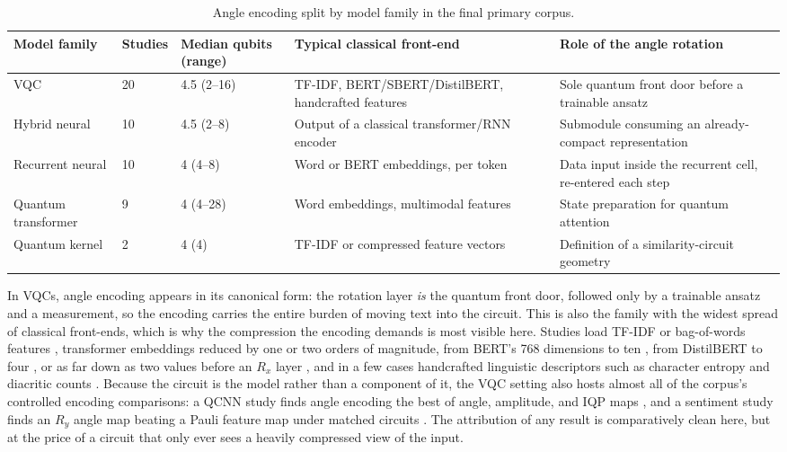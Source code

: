\documentclass{ieeeaccess}
\begin{document}
\begin{table}[t]
\caption{Angle encoding split by model family in the final primary corpus.}
\label{tab:angle_by_family}
\centering
\scriptsize
\begin{tabular}{@{}p{} p{} p{} p{} p{}@{}}
\hline
\textbf{Model family} & \textbf{Studies} & \textbf{Median qubits (range)} & \textbf{Typical classical front-end} & \textbf{Role of the angle rotation} \\
\hline
VQC & 20 & 4.5 (2--16) & TF-IDF, BERT/SBERT/DistilBERT, handcrafted features & Sole quantum front door before a trainable ansatz \\
Hybrid neural & 10 & 4.5 (2--8) & Output of a classical transformer/RNN encoder & Submodule consuming an already-compact representation \\
Recurrent neural & 10 & 4 (4--8) & Word or BERT embeddings, per token & Data input inside the recurrent cell, re-entered each step \\
Quantum transformer & 9 & 4 (4--28) & Word embeddings, multimodal features & State preparation for quantum attention \\
Quantum kernel & 2 & 4 (4) & TF-IDF or compressed feature vectors & Definition of a similarity-circuit geometry \\
\hline
\end{tabular}
\end{table}

In VQCs, angle encoding appears in its canonical form: the rotation layer \emph{is} the quantum front door, followed only by a trainable ansatz and a measurement, so the encoding carries the entire burden of moving text into the circuit. This is also the family with the widest spread of classical front-ends, which is why the compression the encoding demands is most visible here. Studies load TF-IDF or bag-of-words features \cite{thota_comparison_2025}, transformer embeddings reduced by one or two orders of magnitude, from BERT's 768 dimensions to ten \cite{ahmad_hybrid_2023}, from DistilBERT to four \cite{kumar_hybrid_2026}, or as far down as two values before an $R_x$ layer \cite{altintas_beyond_2025}, and in a few cases handcrafted linguistic descriptors such as character entropy and diacritic counts \cite{mompelat_compact_2026}. Because the circuit is the model rather than a component of it, the VQC setting also hosts almost all of the corpus's controlled encoding comparisons: a QCNN study finds angle encoding the best of angle, amplitude, and IQP maps \cite{ouamane_sentiment_2025}, and a sentiment study finds an $R_y$ angle map beating a Pauli feature map under matched circuits \cite{ruskanda_evaluating_2025}. The attribution of any result is comparatively clean here, but at the price of a circuit that only ever sees a heavily compressed view of the input.
\end{document}
